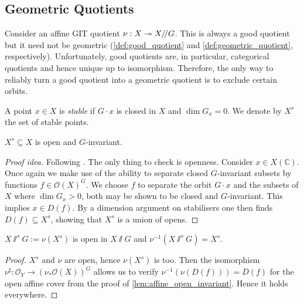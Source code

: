 \documentclass[12pt]{ociamthesis}  %
\begin{document}
\subsection{Geometric Quotients}

Consider an affine GIT quotient $\nu : X \twoheadrightarrow X/\!/ G$. This is
always a good quotient but it need not be geometric
(\ref{def:good_quotient} and \ref{def:geometric_quotient}, respectively).
Unfortunately, good quotients are, in particular, categorical
quotients \cite[Proposition 3.30]{hoskins2016} and hence unique
up to isomorphism. Therefore, the only way to reliably turn a good
quotient into a geometric quotient is to exclude certain orbits.

\begin{definition}\label{def:affine_stability}
  A point $x\in X$ is \emph{stable} if $G\cdot x$ is closed in $X$
  and $\dim G_x = 0$. We denote by $X^s$ the set of stable
  points. 
\end{definition}

\begin{lemma}\label{lem:affine_open_invariant}
  $X^s \subseteq X$ is open and $G$-invariant.
  \begin{proof}[Proof idea]
    Following \cite[Proposition 4.36]{hoskins2016}.
    The only thing to check is openness.
    Consider $x\in X(\mathbb C)$.  Once again we make use of the
    ability to separate closed $G$-invariant subsets by functions
    $f \in \mathscr O(X)^G$. \cite[Lemma 4.29]{hoskins2016}
    We choose $f$ to separate the orbit $G\cdot x$ and the
    subsets of $X$ where $\dim G_x > 0$, both may be shown to
    be closed and $G$-invariant. This implies $x\in D(f)$.
    By a dimension argument on stabilisers one then finds
    $D(f)\subseteq X^s$, showing that $X^s$ is a union of opens.
  \end{proof}
\end{lemma}

\begin{lemma}\label{lem:affine_quotient_is_open}
  $X\sslash^s G := \nu(X^s)$ is open in $X\sslash G$ and
  $\nu^{-1}(X\sslash^s G) = X^s$.
  \begin{proof}
    $X^s$ and $\nu$ are open, hence $\nu(X^s)$ is too.
    Then the isomorphism $\nu^\sharp : \mathscr O_Y \to (\nu_*\mathscr O(X))^G$
    allows us to verify $\nu^{-1}(\nu(D(f))) = D(f)$ for the open
    affine cover from the proof of \ref{lem:affine_open_invariant}.
    Hence it holds everywhere.
  \end{proof}
\end{lemma}
\end{document}
